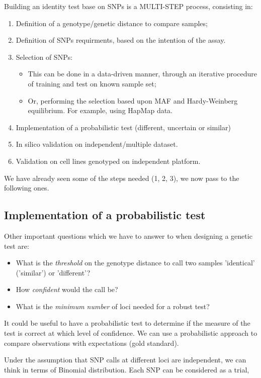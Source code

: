 Building an identity test base on SNPs is a MULTI-STEP process, consisting in: 
\begin{enumerate}
	\item Definition of a genotype/genetic distance to compare samples;
	\item Definition of SNPs requirments, based on the intention of the assay.
	\item Selection of SNPs:
	\begin{itemize}
		\item This can be done in a data-driven manner, through an iterative
		procedure of training and test on known sample set;
		\item Or, performing the selection based upon MAF and Hardy-Weinberg
		equilibrium. For example, using HapMap data.
	\end{itemize}
	\item Implementation of a probabilistic test (different, uncertain or
	similar)
	\item In silico validation on independent/multiple dataset.
	\item Validation on cell lines genotyped on independent platform. 
\end{enumerate}
We have already seen some of the steps needed (1, 2, 3), we now pass to the
following ones.


\subsection{Implementation of a probabilistic test} 

Other important questions which we have to answer to when designing a genetic
test are:
\begin{itemize}
	\item What is the \textit{threshold} on the genotype distance to call two
	samples 'identical' ('similar') or 'different'?
	\item How \textit{confident} would the call be?
    \item What is the \textit{minimum number} of loci needed for a robust test?
\end{itemize}

It could be useful to have a probabilistic test to determine if the measure of
the test is correct at which level of confidence. We can use a probabilistic
approach to compare observations with expectations (gold standard).

\bigskip
Under the assumption that SNP calls at different loci are independent, we can
think in terms of Binomial distribution. Each SNP can be considered as a trial,

